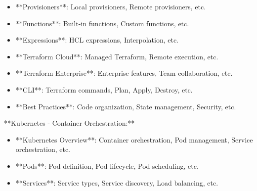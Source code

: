 \documentclass[11pt,a4paper]{article}
\begin{document}
\begin{itemize}
\item **Provisioners**: Local provisioners, Remote provisioners, etc.
\end{itemize}

\begin{itemize}
\item **Functions**: Built-in functions, Custom functions, etc.
\end{itemize}

\begin{itemize}
\item **Expressions**: HCL expressions, Interpolation, etc.
\end{itemize}

\begin{itemize}
\item **Terraform Cloud**: Managed Terraform, Remote execution, etc.
\end{itemize}

\begin{itemize}
\item **Terraform Enterprise**: Enterprise features, Team collaboration, etc.
\end{itemize}

\begin{itemize}
\item **CLI**: Terraform commands, Plan, Apply, Destroy, etc.
\end{itemize}

\begin{itemize}
\item **Best Practices**: Code organization, State management, Security, etc.
\end{itemize}

**Kubernetes - Container Orchestration:**

\begin{itemize}
\item **Kubernetes Overview**: Container orchestration, Pod management, Service orchestration, etc.
\end{itemize}

\begin{itemize}
\item **Pods**: Pod definition, Pod lifecycle, Pod scheduling, etc.
\end{itemize}

\begin{itemize}
\item **Services**: Service types, Service discovery, Load balancing, etc.
\end{itemize}
\end{document}
